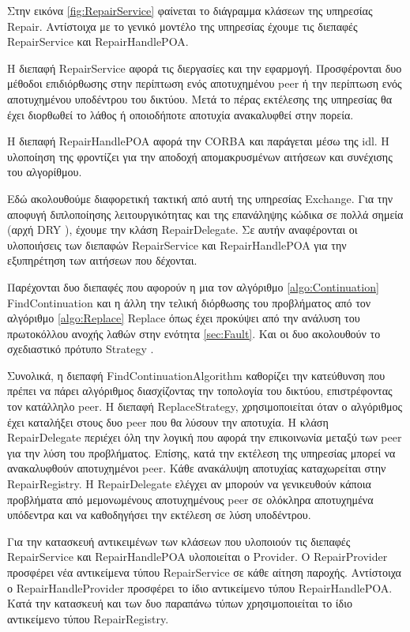 Στην εικόνα \ref{fig:RepairService} φαίνεται το διάγραμμα κλάσεων της υπηρεσίας 
Repair. Αντίστοιχα με το γενικό μοντέλο της υπηρεσίας έχουμε τις 
διεπαφές RepairService και RepairHandlePOA. 

Η διεπαφή RepairService αφορά τις διεργασίες και την εφαρμογή. 
Προσφέρονται δυο μέθοδοι επιδιόρθωσης στην περίπτωση ενός αποτυχημένου 
peer ή την περίπτωση ενός αποτυχημένου υποδέντρου του δικτύου. Μετά το 
πέρας εκτέλεσης της υπηρεσίας θα έχει διορθωθεί το λάθος ή οποιοδήποτε 
αποτυχία ανακαλυφθεί στην πορεία.

Η διεπαφή RepairHandlePOA αφορά την CORBA και παράγεται μέσω της idl. Η 
υλοποίηση της φροντίζει για την αποδοχή απομακρυσμένων αιτήσεων και 
συνέχισης του αλγορίθμου.

Εδώ ακολουθούμε διαφορετική τακτική από αυτή της υπηρεσίας Exchange. Για 
την αποφυγή διπλοποίησης λειτουργικότητας και της επανάληψης κώδικα σε 
πολλά σημεία (αρχή DRY \citep{Pragmatic1999}), 
έχουμε την κλάση RepairDelegate. Σε αυτήν αναφέρονται οι υλοποιήσεις των 
διεπαφών RepairService και RepairHandlePOA για την εξυπηρέτηση των 
αιτήσεων που δέχονται. 

Παρέχονται δυο διεπαφές που αφορούν η μια τον αλγόριθμο \ref{algo:Continuation} 
FindContinuation και η άλλη την τελική διόρθωσης του προβλήματος 
από τον αλγόριθμο \ref{algo:Replace} Replace όπως έχει προκύψει από την 
ανάλυση του πρωτοκόλλου ανοχής λαθών στην ενότητα \ref{sec:Fault}. 
Και οι δυο ακολουθούν το σχεδιαστικό πρότυπο Strategy \citep{GoF}.

Συνολικά, η διεπαφή FindContinuationAlgorithm καθορίζει την κατεύθυνση που 
πρέπει να πάρει αλγόριθμος διασχίζοντας την τοπολογία του δικτύου, 
επιστρέφοντας τον κατάλληλο peer. Η διεπαφή ReplaceStrategy, 
χρησιμοποιείται όταν ο αλγόριθμος έχει καταλήξει στους δυο peer που θα 
λύσουν την αποτυχία. Η κλάση RepairDelegate περιέχει όλη την λογική που 
αφορά την επικοινωνία μεταξύ των peer για την λύση του προβλήματος. 
Επίσης, κατά την εκτέλεση της υπηρεσίας μπορεί να ανακαλυφθούν 
αποτυχημένοι peer. Κάθε ανακάλυψη αποτυχίας καταχωρείται στην 
RepairRegistry. Η RepairDelegate ελέγχει αν μπορούν να γενικευθούν 
κάποια προβλήματα από μεμονωμένους αποτυχημένους peer σε ολόκληρα 
αποτυχημένα υπόδεντρα και να καθοδηγήσει την εκτέλεση σε λύση 
υποδέντρου.

Για την κατασκευή αντικειμένων των κλάσεων που υλοποιούν τις διεπαφές 
RepairService και RepairHandlePOA υλοποιείται ο Provider. Ο RepairProvider 
προσφέρει νέα αντικείμενα τύπου RepairService σε κάθε αίτηση παροχής. 
Αντίστοιχα ο RepairHandleProvider προσφέρει το ίδιο αντικείμενο τύπου 
RepairHandlePOA. Κατά την κατασκευή και των δυο παραπάνω τύπων 
χρησιμοποιείται το ίδιο αντικείμενο τύπου RepairRegistry.

